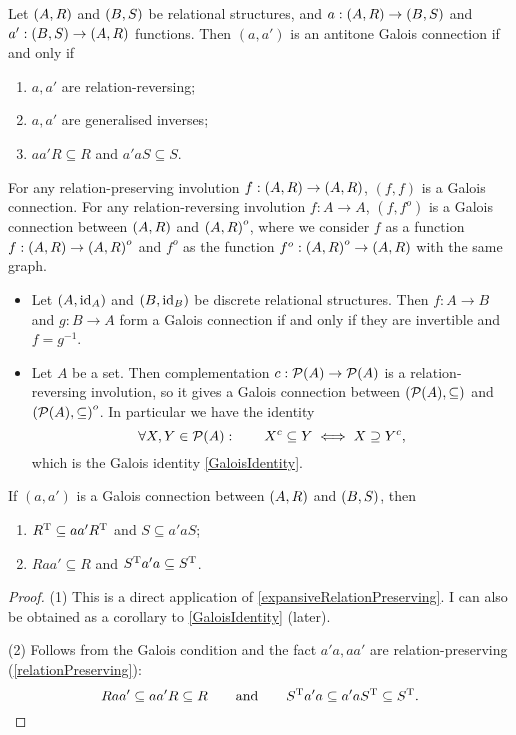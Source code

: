 \begin{lemma}
Let $\sSet{A, R}$ and $\sSet{B, S}$ be relational structures, and $a: \sSet{A,R} \to \sSet{B,S}$ and $a': \sSet{B,S} \to \sSet{A,R}$ functions. Then $(a,a')$ is an antitone Galois connection \textup{if and only if}
\begin{enumerate}
\item $a, a'$ are relation-reversing;
\item $a, a'$ are generalised inverses;
\item $aa'R \subseteq R$ and $a'aS \subseteq S$.
\end{enumerate}
\end{lemma}

For any relation-preserving involution $f: \sSet{A,R} \to \sSet{A,R}$,  $(f,f)$ is a Galois connection. For any relation-reversing involution $f: A\to A$, $(f,f^o)$ is a Galois connection between $\sSet{A,R}$ and $\sSet{A,R}^o$, where we consider $f$ as a function $f: \sSet{A,R} \to \sSet{A,R}^o$ and $f^o$ as the function $f^o: \sSet{A,R}^o \to \sSet{A,R}$ with the same graph.

\begin{example}
\begin{itemize}
\item Let $\sSet{A, \id_A}$ and $\sSet{B, \id_B}$ be discrete relational structures. Then $f: A\to B$ and $g: B \to A$ form a Galois connection if and only if they are invertible and $f = g^{-1}$.
\item Let $A$ be a set. Then complementation $c: \operatorname{\mathcal{P}}(A) \to \operatorname{\mathcal{P}}(A)$ is a relation-reversing involution, so it gives a Galois connection between $\sSet{\powerset(A), \subseteq}$ and $\sSet{\powerset(A), \subseteq}^o$. In particular we have the identity
\[ \forall X, Y\in\operatorname{\mathcal{P}}(A): \qquad X^c \subseteq Y \iff X \supseteq Y^c, \]
which is the Galois identity \ref{GaloisIdentity}.
\end{itemize}
\end{example}

\begin{lemma} \label{immediateGaloisCorollaries}
If $(a,a')$ is a Galois connection between $\sSet{A,R}$ and $\sSet{B,S}$, then
\begin{enumerate}
\item $R^{\mathrm{T}} \subseteq aa'R^{\mathrm{T}}$ and $S \subseteq a'aS$;
\item $Raa' \subseteq R$ and $S^{\mathrm{T}} a'a \subseteq S^{\mathrm{T}}$.
\end{enumerate}
\end{lemma}
\begin{proof}
(1) This is a direct application of \ref{expansiveRelationPreserving}. I can also be obtained as a corollary to \ref{GaloisIdentity} (later).

(2) Follows from the Galois condition and the fact $a'a, aa'$ are relation-preserving (\ref{relationPreserving}):
\[ Raa' \subseteq aa'R \subseteq R \qquad\text{and}\qquad S^{\mathrm{T}} a'a \subseteq a'aS^{\mathrm{T}} \subseteq S^{\mathrm{T}}. \]
\end{proof}


